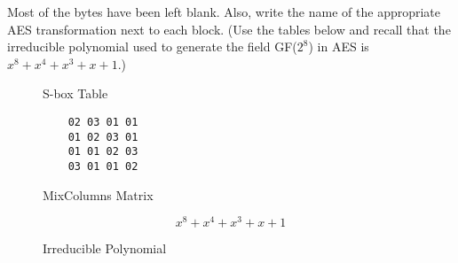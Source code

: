 \documentclass[../hw_sols.tex]{subfiles}
\begin{document}
Most of the bytes have been left blank. Also, write the name of the 
appropriate AES transformation next to each block. (Use the tables below and 
recall that the irreducible polynomial used to generate the field GF($2^8$) 
in AES is $x^8 + x^4 + x^3 + x + 1$.)

\begin{figure}[h]
\centering
\begin{minipage}{0.5\textwidth}
\end{minipage}
	\caption{S-box Table}
	\label{fig:sbox}
\end{figure}

\vspace{1cm}

\begin{figure}[h]
\centering
\begin{minipage}{0.2\textwidth}
	\begin{verbatim}
    02 03 01 01
    01 02 03 01
    01 01 02 03
    03 01 01 02
	\end{verbatim}
\end{minipage}
	\caption{MixColumns Matrix}
	\label{fig:mixcols}
\end{figure}

\vspace{1cm}

\begin{figure}[h]
	\[ x^8 + x^4 + x^3 + x + 1 \]
	\caption{Irreducible Polynomial}
	\label{fig:poly}
\end{figure}


\newpage
\end{document}
